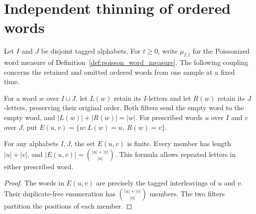 \section{Independent thinning of ordered words}
\label{sec:poisson_word_thinning}

Let $I$ and $J$ be disjoint tagged alphabets. For $t\geq 0$, write
$\mu_{I,t}$ for the Poissonized word measure of
Definition~\ref{def:poisson_word_measure}. The following coupling concerns
the retained and omitted ordered words from one sample at a fixed time.

\begin{definition}
    \label{def:poisson_word_filters}
    \leanok
    For a word $w$ over $I\sqcup J$, let $L(w)$ retain its $I$-letters
    and let $R(w)$ retain its $J$-letters, preserving their original order.
    Both filters send the empty word to the empty word, and
    $|L(w)|+|R(w)|=|w|$. For prescribed words $u$ over $I$ and $v$ over $J$,
    put $E(u,v)=\{w:L(w)=u,\ R(w)=v\}$.
\end{definition}

\begin{lemma}
    \label{lem:poisson_thinning_fiber}
    \leanok
    For any alphabets $I,J$, the set $E(u,v)$ is finite. Every member has
    length $|u|+|v|$, and $|E(u,v)|=\binom{|u|+|v|}{|u|}$.
    This formula allows repeated letters in either prescribed word.
\end{lemma}
\begin{proof}
    \leanok
    The words in $E(u,v)$ are precisely the tagged interleavings of $u$ and $v$.
    Their duplicate-free enumeration has $\binom{|u|+|v|}{|u|}$ members.
    The two filters partition the positions of each member.
\end{proof}

